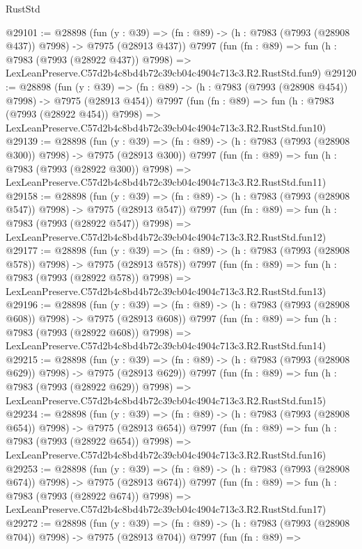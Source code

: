 \begin{lexlean}{RustStd}
\begin{coremodule}
@29101 := @28898
    (fun (y : @39) => (fn : @89) -> (h : @7983 (@7993 (@28908 @437)) @7998) -> @7975 (@28913 @437))
    @7997
    (fun (fn : @89) =>
    fun (h : @7983 (@7993 (@28922 @437)) @7998) =>
    LexLeanPreserve.C57d2b4c8bd4b72c39cb04c4904c713c3.R2.RustStd.fun9)
@29120 := @28898
    (fun (y : @39) => (fn : @89) -> (h : @7983 (@7993 (@28908 @454)) @7998) -> @7975 (@28913 @454))
    @7997
    (fun (fn : @89) =>
    fun (h : @7983 (@7993 (@28922 @454)) @7998) =>
    LexLeanPreserve.C57d2b4c8bd4b72c39cb04c4904c713c3.R2.RustStd.fun10)
@29139 := @28898
    (fun (y : @39) => (fn : @89) -> (h : @7983 (@7993 (@28908 @300)) @7998) -> @7975 (@28913 @300))
    @7997
    (fun (fn : @89) =>
    fun (h : @7983 (@7993 (@28922 @300)) @7998) =>
    LexLeanPreserve.C57d2b4c8bd4b72c39cb04c4904c713c3.R2.RustStd.fun11)
@29158 := @28898
    (fun (y : @39) => (fn : @89) -> (h : @7983 (@7993 (@28908 @547)) @7998) -> @7975 (@28913 @547))
    @7997
    (fun (fn : @89) =>
    fun (h : @7983 (@7993 (@28922 @547)) @7998) =>
    LexLeanPreserve.C57d2b4c8bd4b72c39cb04c4904c713c3.R2.RustStd.fun12)
@29177 := @28898
    (fun (y : @39) => (fn : @89) -> (h : @7983 (@7993 (@28908 @578)) @7998) -> @7975 (@28913 @578))
    @7997
    (fun (fn : @89) =>
    fun (h : @7983 (@7993 (@28922 @578)) @7998) =>
    LexLeanPreserve.C57d2b4c8bd4b72c39cb04c4904c713c3.R2.RustStd.fun13)
@29196 := @28898
    (fun (y : @39) => (fn : @89) -> (h : @7983 (@7993 (@28908 @608)) @7998) -> @7975 (@28913 @608))
    @7997
    (fun (fn : @89) =>
    fun (h : @7983 (@7993 (@28922 @608)) @7998) =>
    LexLeanPreserve.C57d2b4c8bd4b72c39cb04c4904c713c3.R2.RustStd.fun14)
@29215 := @28898
    (fun (y : @39) => (fn : @89) -> (h : @7983 (@7993 (@28908 @629)) @7998) -> @7975 (@28913 @629))
    @7997
    (fun (fn : @89) =>
    fun (h : @7983 (@7993 (@28922 @629)) @7998) =>
    LexLeanPreserve.C57d2b4c8bd4b72c39cb04c4904c713c3.R2.RustStd.fun15)
@29234 := @28898
    (fun (y : @39) => (fn : @89) -> (h : @7983 (@7993 (@28908 @654)) @7998) -> @7975 (@28913 @654))
    @7997
    (fun (fn : @89) =>
    fun (h : @7983 (@7993 (@28922 @654)) @7998) =>
    LexLeanPreserve.C57d2b4c8bd4b72c39cb04c4904c713c3.R2.RustStd.fun16)
@29253 := @28898
    (fun (y : @39) => (fn : @89) -> (h : @7983 (@7993 (@28908 @674)) @7998) -> @7975 (@28913 @674))
    @7997
    (fun (fn : @89) =>
    fun (h : @7983 (@7993 (@28922 @674)) @7998) =>
    LexLeanPreserve.C57d2b4c8bd4b72c39cb04c4904c713c3.R2.RustStd.fun17)
@29272 := @28898
    (fun (y : @39) => (fn : @89) -> (h : @7983 (@7993 (@28908 @704)) @7998) -> @7975 (@28913 @704))
    @7997
    (fun (fn : @89) =>

\end{coremodule}
\end{lexlean}
